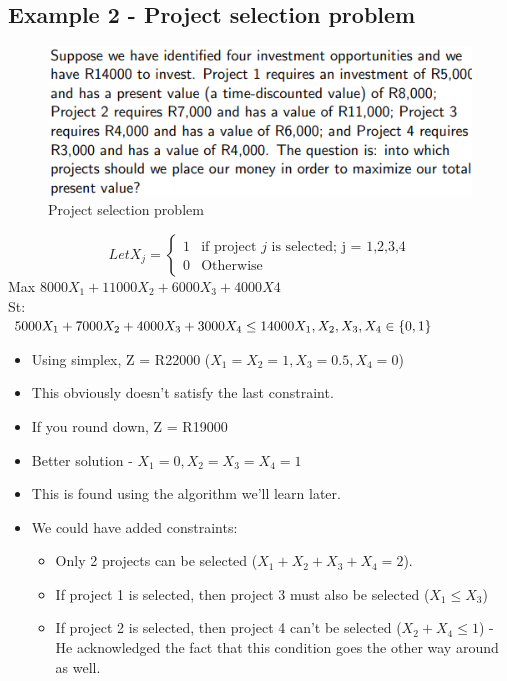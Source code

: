 \documentclass[12pt, a4paper]{article}
\begin{document}
\subsection*{Example 2 - Project selection problem}
\begin{figure}[ht]
    \centering
    \includegraphics*[width=1\textwidth]{example2}
    \caption{Project selection problem}
    \label{fig: Project selection problem}
\end{figure}

\begin{equation}
   Let X_j =
  \begin{cases}
    1 & \text{if project $j$ is selected; j = 1,2,3,4} \\
    0 & \text{Otherwise}
  \end{cases}
\end{equation}
Max $8000X_1+11000X_2+6000X_3+4000X4$\\
St:\\
$5000X_1+7000X_2+4000X_3+3000X_4 \leq 14000\\
X_1, X_2, X_3, X_4 \in \{0,1\} 
$
\begin{itemize}
    \item Using simplex, Z = R22000 ($X_1=X_2=1, X_3=0.5, X_4=0$)
    \item This obviously doesn't satisfy the last constraint.
    \item If you round down, Z = R19000
    \item Better solution - $X_1=0, X_2=X_3=X_4=1$
    \item This is found using the algorithm we'll learn later.
    \item We could have added constraints:
        \begin{itemize}
            \item Only 2 projects can be selected ($X_1+X_2+X_3+X_4 = 2$).
            \item If project 1 is selected, then project 3 must also be selected ($X_1 \leq X_3$)
            \item If project 2 is selected, then project 4 can't be selected ($X_2+X_4 \leq 1$) - He acknowledged the fact that this condition goes the other way around as well.
        \end{itemize}
\end{itemize}
\end{document}
